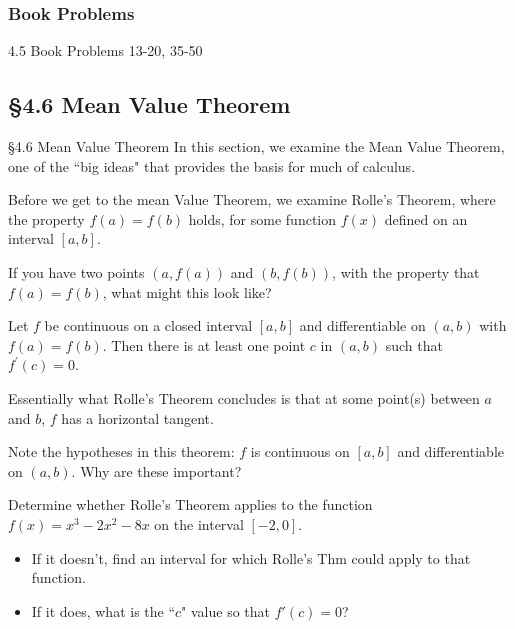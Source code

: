\documentclass[cal1spr16Lectures.tex]{subfiles}
\begin{document}
\subsubsection{Book Problems}

\begin{frame}
\begin{block}{4.5 Book Problems}
13-20, 35-50
\end{block}
\end{frame}

\subsection[4.6 Mean Value Theorem]{\S 4.6 Mean Value Theorem}

\begin{frame}{\S 4.6 Mean Value Theorem}\small
In this section, we examine the Mean Value Theorem, one of the ``big ideas" that provides the basis for much of calculus.  

\vspace{0.5pc}
Before we get to the mean Value Theorem, we examine Rolle's Theorem, where the property $f(a)=f(b)$ holds, for some function $f(x)$ defined on an interval $[a,b]$.

\begin{que}
If you have two points $(a,f(a))$ and $(b,f(b))$, with the property that $f(a)=f(b)$, what might this look like?
\end{que}
\end{frame}

\begin{frame}\small 
\begin{thm}  
Let $f$ be continuous on a closed interval $[a,b]$ and differentiable on $(a,b)$ with $f(a)=f(b)$.  Then there is at least one point $c$ in $(a,b)$ such that $f^{\prime}(c)=0.$ 
\end{thm}
Essentially what Rolle's Theorem concludes is that at some point(s) between $a$ and $b$, $f$ has a horizontal tangent.
\begin{que}
Note the hypotheses in this theorem: $f$ is continuous on $[a,b]$ and differentiable on $(a,b)$.  Why are these important?
\end{que}
\end{frame}

\begin{frame}
\begin{exe}
Determine whether Rolle's Theorem applies to the function $f(x)=x^3-2x^2-8x$ on the interval $[-2,0]$.
\begin{itemize}
\item If it doesn't, find an interval for which Rolle's Thm could apply to that function.
\item If it does, what is the ``$c$" value so that $f'(c)=0$?  
\end{itemize}
\end{exe}
\end{frame}
\end{document}
